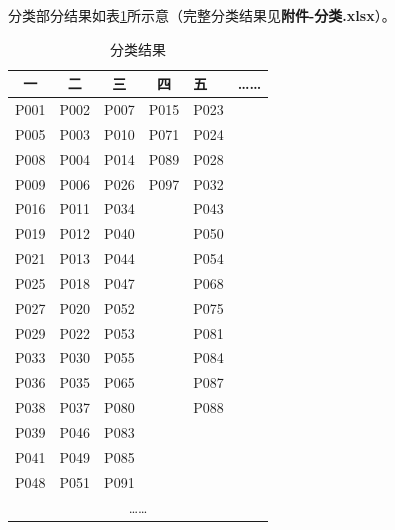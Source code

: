分类部分结果如表\ref{talbe041618}所示意（完整分类结果见\textbf{附件-分类.xlsx}）。

\begin{table}[h]
    \label{talbe041618}
    \caption{分类结果}
    \centering
    \begin{tabular}{@{}cccclc@{}}
        \toprule
        一    & 二    & 三    & 四                    & 五    & ……                   \\ \midrule
        P001 & P002 & P007 & P015                 & P023 &                      \\
        P005 & P003 & P010 & P071                 & P024 &                      \\
        P008 & P004 & P014 & P089                 & P028 &                      \\
        P009 & P006 & P026 & P097                 & P032 &                      \\
        P016 & P011 & P034 &                      & P043 &                      \\
        P019 & P012 & P040 &                      & P050 &                      \\
        P021 & P013 & P044 &                      & P054 &                      \\
        P025 & P018 & P047 &                      & P068 &                      \\
        P027 & P020 & P052 &                      & P075 &                      \\
        P029 & P022 & P053 &                      & P081 &                      \\
        P033 & P030 & P055 &                      & P084 &                      \\
        P036 & P035 & P065 &                      & P087 &                      \\
        P038 & P037 & P080 &                      & P088 &                      \\
        P039 & P046 & P083 &                      &      &                      \\
        P041 & P049 & P085 &                      &      &                      \\
        P048 & P051 & P091 & \multicolumn{1}{l}{} &      & \multicolumn{1}{l}{} \\
        \multicolumn{6}{c}{……}                                                  \\ \bottomrule
        \end{tabular}
\end{table}

